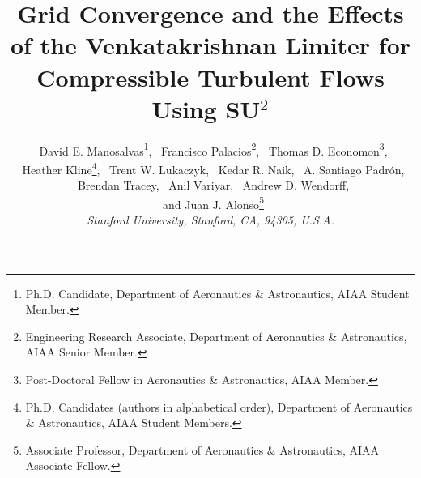 
\title{Grid Convergence and the Effects of the Venkatakrishnan Limiter for Compressible Turbulent Flows Using SU$^2$}

 \author{
     \ David E. Manosalvas\thanks{Ph.D. Candidate, Department of Aeronautics \& Astronautics, AIAA Student Member.},
     \ Francisco Palacios\thanks{Engineering Research Associate, Department of Aeronautics \& Astronautics, AIAA Senior Member.},
     \ Thomas D. Economon\thanks{Post-Doctoral Fellow in Aeronautics \& Astronautics, AIAA Member.},\\
     \ Heather Kline\thanks{Ph.D. Candidates (authors in alphabetical order), Department of Aeronautics \& Astronautics, AIAA Student Members.},
     \ Trent W. Lukaczyk,
     \ Kedar R. Naik, 
     \ A. Santiago Padr\'on,\\
     \ Brendan Tracey,
     \ Anil Variyar,
     \ Andrew D. Wendorff,\\
   \ and Juan J. Alonso\thanks{Associate Professor, Department of Aeronautics \& Astronautics, AIAA Associate Fellow.}\\
  {\normalsize\itshape Stanford University, Stanford, CA, 94305, U.S.A.}
 }


